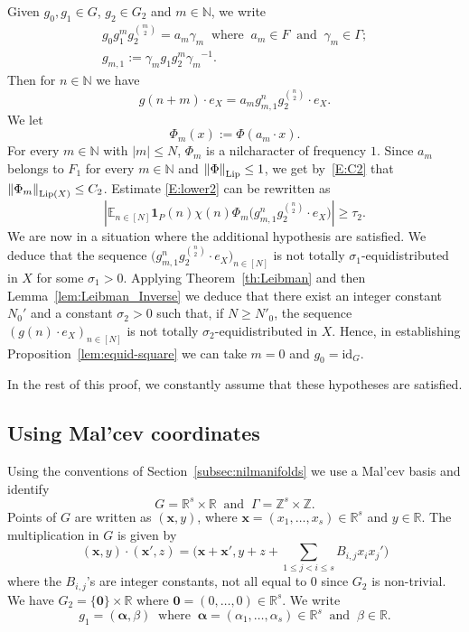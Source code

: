 \documentclass[11pt]{amsart}
\theoremstyle{definition}
\begin{document}
Given $g_0, g_1\in G$, $g_2\in G_2$ and   $m\in {{\mathbb N}}$,  we write
\begin{gather*}
g_0g_1^mg_2^{\binom m2}=a_m\gamma_m\ \text{ where }\ a_m \in F\ \text{ and }\ \gamma_m\in\Gamma;\\
g_{m,1}:=\gamma_m g_1g_2^m\gamma_m{^{-1}}.
\end{gather*}
Then for $n\in {{\mathbb N}}$ we have
$$
g(n+m)\cdot e_X=a_mg_{m,1}^{n}g_2^{\binom {n}2}\cdot e_X.
$$
We let
$$
\Phi_m(x):=\Phi(a_m\cdot x).
$$
For every $m\in {{\mathbb N}}$ with $|m|\leq N$, $\Phi_m$ is a nilcharacter of frequency $1$.  Since $a_m$ belongs to  $F_1$ for every $m\in {{\mathbb N}}$ and ${\lVert {\Phi} \rVert}_{{\text{\rm Lip}}}\leq 1$,  we get by~\eqref{E:C2} that  ${\lVert {\Phi_m} \rVert}_{{{\text{\rm Lip}}}(X)}\leq C_2$. Estimate \eqref{E:lower2} can be rewritten as
$$
|{{\mathbb E}}_{n\in[N]} {\mathbf{1}}_P(n)
\chi(n)\Phi_m\bigl(g_{m,1}^ng_2^{\binom n2}\cdot e_X\bigr)|\geq\tau_2.
$$
We are now in a situation where the additional hypothesis are satisfied. We deduce that
the sequence $\bigl(g_{m,1}^ng_2^{\binom n2}\cdot e_X\bigr)_{n\in[N]}$ is not totally $\sigma_1$-equidistributed in $X$ for some $\sigma_1>0$.
Applying Theorem~\ref{th:Leibman} and then Lemma~\ref{lem:Leibman_Inverse} we deduce
that there exist an integer constant
$N_0'$ and a constant $\sigma_2>0$  such that, if $N\geq N'_0$,
the sequence $(g(n)\cdot e_X)_{n\in[N]}$ is not totally $\sigma_2$-equidistributed in $X$. Hence, in establishing  Proposition~\ref{lem:equid-square} we can take $m=0$ and   $g_0=\text{id}_G$.

In the rest of this proof, we constantly assume that these hypotheses are satisfied.
\subsection{Using Mal'cev coordinates}
Using the conventions of Section~\ref{subsec:nilmanifolds}
we use a Mal'cev basis and identify
$$
G={{\mathbb R}}^{s}\times{{\mathbb R}} \ \text{ and }\ \Gamma={{\mathbb Z}}^{s}\times{{\mathbb Z}}.
$$
 Points of $G$ are written as $({{\mathbf{x}}},y)$, where ${{\mathbf{x}}}=(x_1,\dots,x_s)\in{{\mathbb R}}^s$ and $y\in{{\mathbb R}}$.  The multiplication in $G$ is given by
$$
({{\mathbf{x}}},y)\cdot({{\mathbf{x}}}',z)=\bigl({{\mathbf{x}}}+{{\mathbf{x}}}', y+z+ \sum_{1\leq j<i\leq s}B_{i,j}x_ix_j'\bigr)
$$
where the $B_{i,j}$'s are integer constants,  not all equal to $0$ since $G_2$ is non-trivial.
 We have $G_2=\{{{\boldsymbol{0}}}\}\times{{\mathbb R}}$
where ${{\boldsymbol{0}}}= (0,\dots,0)\in{{\mathbb R}}^s$.
  We write
 \begin{equation}
\label{eq:defg1}
g_1=({{\boldsymbol{\alpha}}},\beta)\ \text{ where }\ {{\boldsymbol{\alpha}}}=(\alpha_1,\dots,\alpha_s)\in{{\mathbb R}}^s\ \text{ and }\ \beta\in{{\mathbb R}}.
\end{equation}
\end{document}
